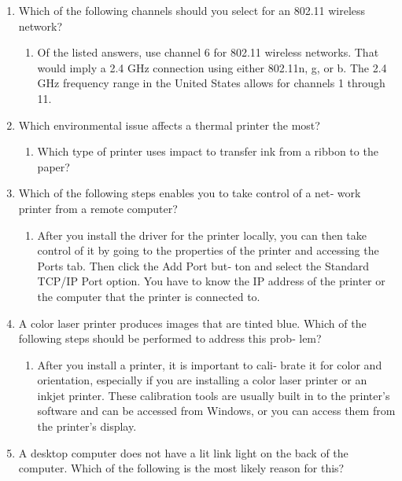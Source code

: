 \documentclass{article}
\begin{document}
\begin{enumerate}
\begin{enumerate}
    \end{enumerate}
    \item Which	of	the	following	channels	should	you	select	for	an	802.11
wireless	network?

    \begin{enumerate}
        \item Of	the	listed	answers,	use	channel	6	for	802.11
wireless	networks.	That	would	imply	a	2.4	GHz	connection	using
either	802.11n,	g,	or	b.	The	2.4	GHz	frequency	range	in	the
United	States	allows	for	channels	1	through	11.

    \end{enumerate}
    \item Which	environmental	issue	affects	a	thermal	printer	the	most?

    \begin{enumerate}
        \item Which	type	of	printer	uses	impact	to	transfer	ink	from	a	ribbon	to
the	paper?

    \end{enumerate}
    \item Which	of	the	following	steps	enables	you	to	take	control	of	a	net‐
work	printer	from	a	remote	computer?

    \begin{enumerate}
        \item 	After	you	install	the	driver	for	the	printer	locally,
you	can	then	take	control	of	it	by	going	to	the	properties	of	the
printer	and	accessing	the	Ports	tab.	Then	click	the	Add	Port	but‐
ton	and	select	the	Standard	TCP/IP	Port	option.	You	have	to
know	the	IP	address	of	the	printer	or	the	computer	that	the	printer
is	connected	to.

    \end{enumerate}
    \item 	A	color	laser	printer	produces	images	that	are	tinted	blue.	Which
of	the	following	steps	should	be	performed	to	address	this	prob‐
lem?

    \begin{enumerate}
        \item After	you	install	a	printer,	it	is	important	to	cali‐
brate	it	for	color	and	orientation,	especially	if	you	are	installing	a
color	laser	printer	or	an	inkjet	printer.	These	calibration	tools	are
usually	built	in	to	the	printer’s	software	and	can	be	accessed	from
Windows,	or	you	can	access	them	from	the	printer’s	display.

    \end{enumerate}
    \item A	desktop	computer	does	not	have	a	lit	link	light	on	the	back	of
the	computer.	Which	of	the	following	is	the	most	likely	reason	for
this?


\end{enumerate}
\end{document}
